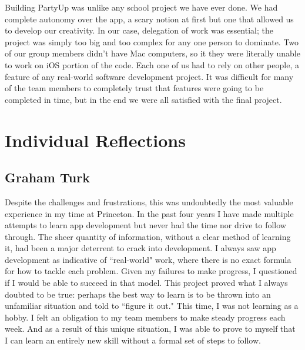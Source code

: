 \documentclass[12pt]{article}
\begin{document}
Building PartyUp was unlike any school project we have ever done. 
We had complete autonomy over the app, a scary notion at first but one that allowed us to develop our creativity. 
In our case, delegation of work was essential; the project was simply too big and too complex for any one person to dominate. 
Two of our group members didn't have Mac computers, so it they were literally unable to work on iOS portion of the code. 
Each one of us had to rely on other people, a feature of any real-world software development project. 
It was difficult for many of the team members to completely trust that features were going to be completed in time, but in the end we were all satisfied with the final project.

\section{Individual Reflections}

\subsection{Graham Turk}

Despite the challenges and frustrations, this was undoubtedly the most valuable experience in my time at Princeton. In the past four years I have made multiple attempts to learn app development but never had the time nor drive to follow through. The sheer quantity of information, without a clear method of learning it, had been a major deterrent to crack into development. I always saw app development as indicative of ``real-world" work, where there is no exact formula for how to tackle each problem. Given my failures to make progress, I questioned if I would be able to succeed in that model. This project proved what I always doubted to be true: perhaps the best way to learn is to be thrown into an unfamiliar situation and told to ``figure it out." This time, I was not learning as a hobby. I felt an obligation to my team members to make steady progress each week. And as a result of this unique situation, I was able to prove to myself that I can learn an entirely new skill without a formal set of steps to follow. 
\end{document}
